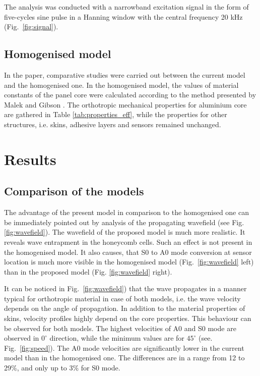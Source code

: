 \documentclass[a4paper,12pt]{article}
\begin{document}
{The analysis was conducted with a narrowband excitation signal in the form of five-cycles sine pulse in a Hanning window with the central frequency 20 kHz (Fig.~\ref{fig:signal}).

\subsection{Homogenised model}
\label{sec:homogenization}
In the paper, comparative studies were carried out between the current model and the homogenised one. 
In the homogenised model, the values of material constants of the panel core were calculated according to the method presented by Malek and Gibson \cite{malek2015effective}.
The orthotropic mechanical properties for aluminium core are gathered in Table \ref{tab:properties_eff}, while the properties for other structures, i.e. skins, adhesive layers and sensors remained unchanged.

\section{Results}
\label{sec:results}
\subsection{Comparison of the models}
The advantage of the present model in comparison to the homogenised one can be immediately pointed out by analysis of the propagating wavefield (see Fig. \ref{fig:wavefield}).
The wavefield of the proposed model is much more realistic.
It reveals wave entrapment in the honeycomb cells.
Such an effect is not present in the homogenised model.
It also causes, that S0 to A0 mode conversion at sensor location is much more visible in the homogenised model (Fig.~\ref{fig:wavefield} left) than in the proposed model (Fig. \ref{fig:wavefield} right).

It can be noticed in Fig.~\ref{fig:wavefield}) that the wave propagates in a manner typical for orthotropic material in case of both models, i.e. the wave velocity depends on the angle of propagation.
In addition to the material properties of skins, velocity profiles highly depend on the core properties.
This behaviour can be observed for both models.
The highest velocities of A0 and S0 mode are observed in $0^{\circ}$ direction, while the minimum values are for $45^{\circ}$ (see. Fig.~\ref{fig:speed}).
The A0 mode velocities are significantly lower in the current model than in the homogenised one.
The differences are in a range from 12 to 29\%, and only up to 3\% for S0 mode.  

}
\end{document}
